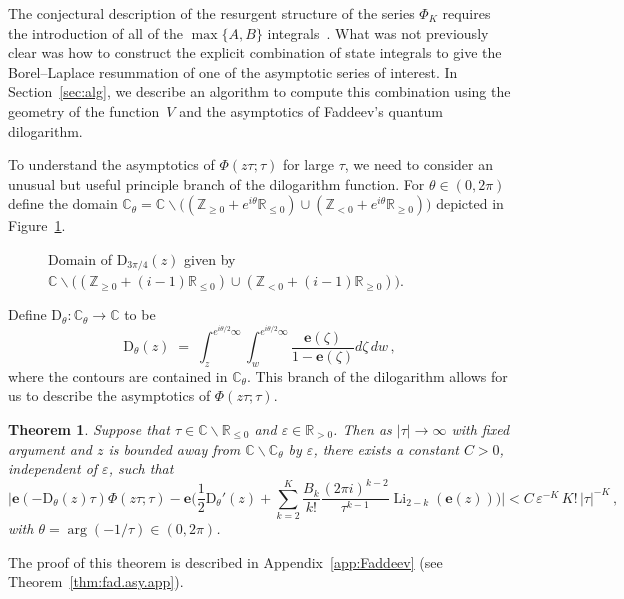\documentclass[12pt,reqno]{amsart}
\newtheorem{theorem}{Theorem}[section]
\theoremstyle{definition}
\def\BZ{\mathbb Z}
\def\BR{\mathbb R}
\def\BC{\mathbb C}
\def\be{\begin{equation}}
\def\ee{\end{equation}}
\def\z{\zeta}
\def\e{\mathbf e}
\renewcommand{\=}{\;=\;}
\newcommand{\Li}{\operatorname{Li}}
\begin{document}
The conjectural description of the resurgent structure of the series $\Phi_{K}$ requires the introduction of all of the $\max\{A,B\}$ integrals~\cite{GGM:I}. What was not previously clear was how to construct the explicit combination of state integrals to give the Borel--Laplace resummation of one of the asymptotic series of interest. In Section~\ref{sec:alg}, we describe an algorithm to compute this combination using the geometry of the function~$V$ and the asymptotics of Faddeev's quantum dilogarithm. 

\medskip

To understand the asymptotics of $\Phi(z\tau;\tau)$ for large $\tau$, we need to consider an unusual but useful principle branch of the dilogarithm function. For $\theta\in(0,2\pi)$ define the domain $\BC_{\theta}=\BC\backslash\big((\BZ_{\geq0}+e^{i\theta}\BR_{\leq0})\cup(\BZ_{<0}+ e^{i\theta}\BR_{\geq0})\big)$ depicted in Figure~\ref{fig:prin.bran.fad}. 
%
\begin{figure}[ht]
\caption{Domain of $\mathrm{D}_{3\pi/4}(z)$ given by $\BC\backslash\big((\BZ_{\geq0}+(i-1)\BR_{\leq0})\cup(\BZ_{<0}+(i-1)\BR_{\geq0})\big)$.}
\label{fig:prin.bran.fad}
\end{figure}

\noindent Define $\mathrm{D}_{\theta}:\BC_{\theta}\rightarrow\BC$ to be
\be
  \mathrm{D}_{\theta}(z)
  \=
  \int_{z}^{e^{i\theta/2}\infty}
  \int_{w}^{e^{i\theta/2}\infty}
  \frac{\e(\z)}{1-\e(\z)}d\z\,dw\,,
\ee
where the contours are contained in $\BC_{\theta}$. This branch of the dilogarithm allows for us to describe the asymptotics of $\Phi(z\tau;\tau)$.
\begin{theorem}\label{thm:fad.asymp}
Suppose that $\tau\in\BC\backslash\BR_{\leq0}$ and $\varepsilon\in\BR_{>0}$. Then as $|\tau|\rightarrow \infty$ with fixed argument and $z$ is bounded away from $\BC\backslash\BC_{\theta}$ by $\varepsilon$, there exists a constant $C>0$, independent of $\varepsilon$, such that
\be
    \Big|\e(-\mathrm{D}_{\theta}(z)\tau)\Phi(z\tau;\tau)
    -
    \e\Big(\frac{1}{2}\mathrm{D}_{\theta}'(z)
    +
    \sum_{k=2}^{K}\frac{B_k}{k!}\frac{(2\pi i)^{k-2}}{\tau^{k-1}}\Li_{2-k}(\e(z))\Big)
    \Big|
    <
    C\,\varepsilon^{-K}\,K!\,|\tau|^{-K}\,,
\ee
with $\theta=\arg(-1/\tau)\in(0,2\pi)$.
\end{theorem}
\noindent The proof of this theorem is described in Appendix~\ref{app:Faddeev} (see Theorem~\ref{thm:fad.asy.app}).
%
\end{document}
